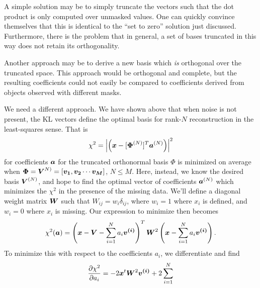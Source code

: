 A simple solution may be to simply truncate the vectors such that the dot
product is only computed over unmasked values.  One can quickly convince
themselves that this is identical to the ``set to zero'' solution just
discussed.  Furthermore, there is the problem that in general, a set
of bases truncated in this way does not retain its orthogonality.

Another approach may be to derive a new basis which {\it is} orthogonal
over the truncated space.  This approach would be orthogonal and complete,
but the resulting coefficients could not easily be compared to coefficients
derived from objects observed with different masks.

We need a different approach.  We have shown above that when noise is
not present, the KL vectors define the optimal basis for rank-$N$
reconstruction in the least-squares sense.  That is
\begin{equation}
  \chi^2 = \left|\left(\boldsymbol{x}
  - [\boldsymbol{\Phi}^{(N)}]^T\boldsymbol{a}^{(N)}\right)\right|^2
\end{equation}
for coefficients $\boldsymbol{a}$ for the truncated orthonormal basis
$\Phi$ is minimized on average when
$\boldsymbol{\Phi} = \boldsymbol{V}^{N)}
= [\boldsymbol{v_1}, \boldsymbol{v_2} \cdots \boldsymbol{v_M}]$, $N \le M$.
Here, instead, we know the desired basis $\boldsymbol{V}^{(N)}$, and hope to find
the optimal vector of coefficients $\boldsymbol{a}^{(N)}$ which minimizes the
$\chi^2$ in the presence of the missing data.  We'll define a 
diagonal weight matrix $\boldsymbol{W}$ such that $W_{ij} = w_i\delta_{ij}$,
where $w_i=1$ where $x_i$ is defined, and $w_i=0$ where $x_i$ is
missing.  Our expression to minimize then becomes
\begin{equation}
  \chi^2(\boldsymbol{a}) = \left(\boldsymbol{x} - \boldsymbol{V}
  - \sum_{i=1}^N a_i \boldsymbol{v^{(i)}}\right)^T
  \boldsymbol{W}^2 \left(\boldsymbol{x}
  - \sum_{i=1}^N a_i \boldsymbol{v^{(i)}}\right).
\end{equation}
To minimize this with respect to the coefficients $a_i$, we differentiate
and find
\begin{equation}
  \frac{\partial\chi^2}{\partial a_i} = -2 \boldsymbol{x}^t\boldsymbol{W}^2\boldsymbol{v^{(i)}}
  + 2\sum_{i=1}^N 
\end{equation}

\newpage

















